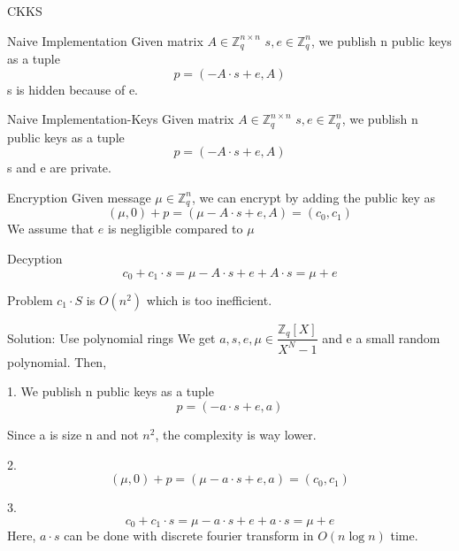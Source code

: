 \documentclass{beamer}
\begin{document}
	\begin{frame}
		CKKS
	\end{frame}
	\begin{frame}{Naive Implementation}
		Given matrix $A \in \mathbb{Z}^{n \times n}_q$ $s, e \in \mathbb{Z}^n_q$, we publish n public keys as a tuple
		\begin{equation*}
			p=(-A \cdot s + e, A)
		\end{equation*}
		s is hidden because of e.
	\end{frame}
	\begin{frame}{Naive Implementation-Keys}
		Given matrix $A \in \mathbb{Z}^{n \times n}_q$ $s, e \in \mathbb{Z}^n_q$, we publish n public keys as a tuple
		\begin{equation*}
			p=(-A \cdot s + e, A)
		\end{equation*}
		s and e are private.
	\end{frame}
	\begin{frame}{Encryption}
		Given message $\mu \in \mathbb{Z}^n_q$, we can encrypt by adding the public key as
		\begin{equation*}
			(\mu, 0) + p=(\mu -A \cdot s + e, A) = (c_0, c_1)
		\end{equation*}
		We assume that $e$ is negligible compared to $\mu$
	\end{frame}
	\begin{frame}{Decyption}
		\begin{equation*}
			c_0+c_1\cdot s = \mu -A \cdot s + e + A \cdot s = \mu + e
		\end{equation*}
		
	\end{frame}
	\begin{frame}{Problem}
		$c_1 \cdot S$ is $O(n^2)$ which is too inefficient.
	\end{frame}
	\begin{frame}{Solution: Use polynomial rings}
		We get $a, s, e, \mu \in \dfrac{\mathbb{Z}_{q}[X]}{X^N-1}$ and e a small random polynomial. Then,
		
		1. We publish n public keys as a tuple
		\begin{equation*}
			p=(-a \cdot s + e, a)
		\end{equation*}
		
		Since a is size n and not $n^2$, the complexity is way lower.
		
		2. 
		\begin{equation*}
			(\mu, 0) + p=(\mu -a \cdot s + e, a) = (c_0, c_1)
		\end{equation*}
		
		3.
		\begin{equation*}
			c_0+c_1\cdot s = \mu -a \cdot s + e + a \cdot s = \mu + e
		\end{equation*}
		Here, $a \cdot s$ can be done with discrete fourier transform in $O(n\log n)$ time.
	\end{frame}
\end{document}
